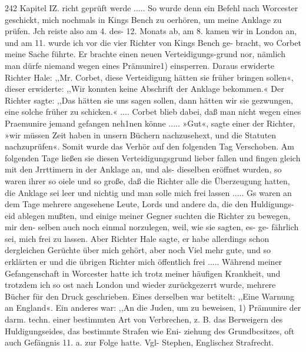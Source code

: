 242 Kapitel IZ.
richt geprüft werde ..... So wurde denn ein Befehl
nach Worcester geschickt, mich nochmals in Kings Bench zu
oerhören, um meine Anklage zu prüfen. Jch reiste also am 4.
des- 12. Monats ab, am 8. kamen wir in London an, und
am 11. wurde ich vor die vier Richter von Kings Bench ge-
bracht, wo Corbet meine Sache führte. Er brachte einen neuen
Verteidigungs-grund nor, nämlich man dürfe niemand wegen eines
Prämunire1) einsperren. Daraus erwiderte Richter Hale: ,,Mr.
Corbet, diese Verteidigung hätten sie früher bringen sollen«, dieser
erwiderte: ,,Wir konnten keine Abschrift der Anklage bekommen.«
Der Richter sagte: ,,Das hätten sie uns sagen sollen, dann
hätten wir sie gezwungen, eine solche früher zu schicken.« ....
Corbet blieb dabei, daß man nicht wegen eines Praemunire
jemand gefangen neh1nen könne ..... »Gut«, sagte einer der
Richter, »wir müssen Zeit haben in unsern Büchern nachzusehext,
und die Statuten nachzuprüfen«. Somit wurde das Verhör auf
den folgenden Tag Verschoben.
Am folgenden Tage ließen sie diesen Verteidigungsgrund
lieber fallen und fingen gleich mit den Jrrttimern in der Anklage
an, und als- dieselben eröffnet wurden, so waren ihrer so oiele
und so große, daß die Richter alle die Überzeugung hatten,
die Anklage sei leer und nichtig und man solle mich frei
lassen ..... Gs waren an dem Tage mehrere angesehene Leute,
Lords und andere da, die den Huldigungs-eid ablegen mußten, und
einige meiner Gegner suchten die Richter zu bewegen, mir den-
selben auch noch einmal norzulegen, weil, wie sie sagten, es- ge-
fährlich sei, mich frei zu lassen. Aber Richter Hale sagte, er habe
allerdings schon dergleichen Gerüchte über mich gehört, aber noch
Viel mehr gute, und so erklärten er und die übrigen Richter mich
öffentlich frei .....
Während meiner Gefangenschaft in Worcester hatte ich trotz
meiner häufigen Krankheit, und trotzdem ich so ost nach London
und wieder zurückgezerrt wurde, mehrere Bücher für den Druck
geschrieben. Eines derselben war betitelt: ,,Eine Warnung an
England«. Ein anderes war: ,,An die Juden, um zu beweisen,
1) Prämunire der darm. techn. einer bestimmten Art von Verbrechen,
z. B. das Berweigern des Huldigungseides, das bestimmte Strafen wie Eni-
ziehung des Grundbcsitzes, oft auch Gefängnis 11. a. zur Folge hatte. Vgl-
Stephen, Englischez Strafrecht.


